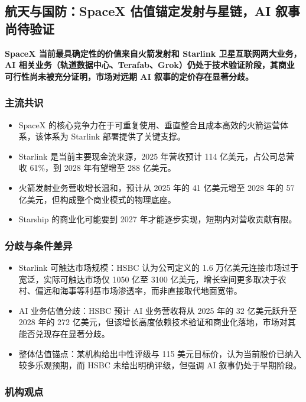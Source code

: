 \documentclass[11pt]{ctexart}
\begin{document}
\subsection{航天与国防：SpaceX 估值锚定发射与星链，AI 叙事尚待验证}
\textbf{SpaceX 当前最具确定性的价值来自火箭发射和 Starlink 卫星互联网两大业务，AI 相关业务（轨道数据中心、Terafab、Grok）仍处于技术验证阶段，其商业可行性尚未被充分证明，市场对远期 AI 叙事的定价存在显著分歧。}
\subsubsection*{主流共识}
\begin{itemize}
  \item SpaceX 的核心竞争力在于可重复使用、垂直整合且成本高效的火箭运营体系，该体系为 Starlink 部署提供了关键支撑。
  \item Starlink 是当前主要现金流来源，2025 年营收预计 114 亿美元，占公司总营收 61\%，到 2028 年有望增至 288 亿美元。
  \item 火箭发射业务营收增长温和，预计从 2025 年的 41 亿美元增至 2028 年的 57 亿美元，但构成整个商业模式的物理底座。
  \item Starship 的商业化可能要到 2027 年才能逐步实现，短期内对营收贡献有限。
\end{itemize}
\subsubsection*{分歧与条件差异}
\begin{itemize}
  \item Starlink 可触达市场规模：HSBC 认为公司定义的 1.6 万亿美元连接市场过于宽泛，实际可触达市场仅 1050 亿至 3100 亿美元，增长空间更多取决于农村、偏远和海事等利基市场渗透率，而非直接取代地面宽带。
  \item AI 业务估值分歧：HSBC 预计 AI 业务营收将从 2025 年的 32 亿美元跃升至 2028 年的 272 亿美元，但该增长高度依赖技术验证和商业化落地，市场对其能否兑现存在显著分歧。
  \item 整体估值锚点：某机构给出中性评级与 115 美元目标价，认为当前股价已纳入较多乐观预期，而 HSBC 未给出明确评级，但强调 AI 叙事仍处于早期阶段。
\end{itemize}
\subsubsection*{机构观点}
\end{document}
